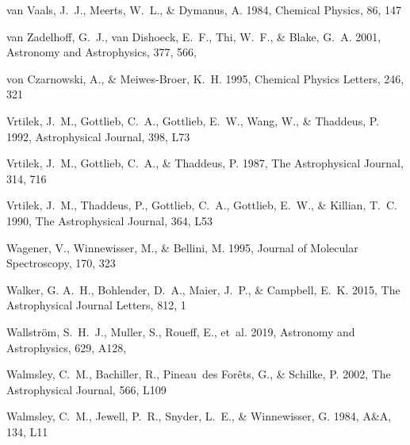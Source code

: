 \documentclass[twocolumn]{aastex631}
\begin{document}
\begin{thebibliography}{}
van Vaals, J.~J., Meerts, W.~L., \& Dymanus, A. 1984, Chemical Physics, 86, 147

{van Zadelhoff}, G.~J., {van Dishoeck}, E.~F., {Thi}, W.~F., \& {Blake}, G.~A.
  2001, Astronomy and Astrophysics, 377, 566,

von Czarnowski, A., \& Meiwes-Broer, K.~H. 1995, Chemical Physics Letters, 246,
  321

Vrtilek, J.~M., Gottlieb, C.~A., Gottlieb, E.~W., Wang, W., \& Thaddeus, P.
  1992, Astrophysical Journal, 398, L73

Vrtilek, J.~M., Gottlieb, C.~A., \& Thaddeus, P. 1987, The Astrophysical
  Journal, 314, 716

Vrtilek, J.~M., Thaddeus, P., Gottlieb, C.~A., Gottlieb, E.~W., \& Killian,
  T.~C. 1990, The Astrophysical Journal, 364, L53

Wagener, V., Winnewisser, M., \& Bellini, M. 1995, Journal of Molecular
  Spectroscopy, 170, 323

Walker, G. A.~H., Bohlender, D.~A., Maier, J.~P., \& Campbell, E.~K. 2015, The
  Astrophysical Journal Letters, 812, 1

{Wallstr{\"o}m}, S.~H.~J., {Muller}, S., {Roueff}, E., {et~al.} 2019, Astronomy
  and Astrophysics, 629, A128, 

Walmsley, C.~M., Bachiller, R., Pineau~des For{\^e}ts, G., \& Schilke, P. 2002,
  The Astrophysical Journal, 566, L109

Walmsley, C.~M., Jewell, P.~R., Snyder, L.~E., \& Winnewisser, G. 1984, A{\&}A,
  134, L11


\end{thebibliography}
\end{document}
